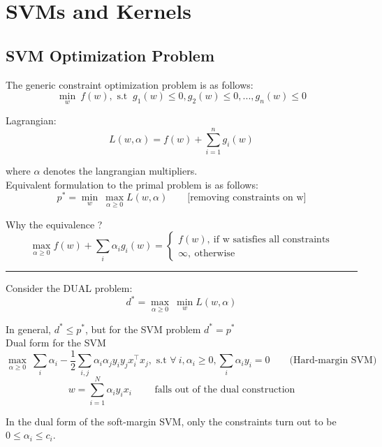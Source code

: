 \chapter{SVMs and Kernels}

\section{SVM Optimization Problem}

The generic constraint optimization problem is as follows:
$$
  \underset{w}{\operatorname{min}} \ f(w), \text{ s.t } \ g_1(w) \leq 0, g_2(w) \leq 0, ..., g_n(w) \leq 0
$$

Lagrangian:
$$
  L(w,\alpha) = f(w) + \sum_{i=1}^n g_i(w)
$$

where $\alpha$ denotes the langrangian multipliers. \\

Equivalent formulation to the primal problem is as follows:
$$
  p^* = \underset{w}{\operatorname{min}} \ \underset{\alpha \geq 0}{\operatorname{max}} L(w,\alpha) \qquad \text{[removing constraints on w]}
$$

Why the equivalence ?
$$
  \underset{\alpha \geq 0}{\operatorname{max}} f(w) + \sum_i \alpha_i g_i(w) = \begin{cases}
    f(w), \ \text{if w satisfies all constraints} \\
    \infty, \ \text{otherwise}
  \end{cases}
$$

\hrule
\vspace{4mm}

Consider the DUAL problem:
$$
  d^* = \underset{\alpha \geq 0}{\operatorname{max}} \ \underset{w}{\operatorname{min}} L(w,\alpha)
$$

In general, $d^* \leq p^*$, but for the SVM problem $d^* = p^*$ \\

Dual form for the SVM
$$
  \underset{\alpha \geq 0}{\operatorname{max}} \ \sum_i \alpha_i - \frac{1}{2} \sum_{i,j} {\alpha_i\alpha_j y_iy_jx_i^\top x_j}, \text{ s.t } \forall \ i, \alpha_i \geq 0, \sum_i \alpha_iy_i = 0 \qquad \text{(Hard-margin SVM)}
$$
$$
  \boxed{w = \sum_{i=1}^N {\alpha_iy_ix_i}} \qquad \text{ falls out of the dual construction}
$$

In the dual form of the soft-margin SVM, only the constraints turn out to be $0 \leq \alpha_i \leq c_i$. \\

